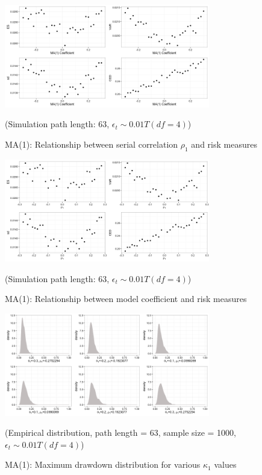\documentclass[11pt]{article}
\begin{document}
\begin{figure}[H]
\centering
\includegraphics[width = 0.8\textwidth]{../figures/simulation/T_dist_MA1_risk_measures_coefficient.png}
\caption{MA(1): Relationship between serial correlation $\rho_1$ and risk measures}
(Simulation path length: 63, $\epsilon_t \sim 0.01T(df = 4)$)
\label{fig:T_dist_MA1_risk_measures_coefficient}
\end{figure}

\begin{figure}[H]
\centering
\includegraphics[width = 0.8\textwidth]{../figures/simulation/T_dist_MA1_risk_measures_acf1.png}
\caption{MA(1): Relationship between model coefficient and risk measures}
(Simulation path length: 63, $\epsilon_t \sim 0.01T(df = 4)$)
\label{fig:T_dist_MA1_risk_measures_acf1}
\end{figure} 

\begin{figure}[H]
\centering
\includegraphics[width = 0.8\textwidth]{../figures/simulation/T_dist_MA1_maxDrawdown_dist}
\caption{MA(1): Maximum drawdown distribution for various $\kappa_1$ values }
(Empirical distribution, path length = 63, sample size = 1000, $\epsilon_t \sim 0.01T(df = 4)$)
\label{fig:T_dist_MA1_maxDrawdown_dist}
\end{figure}
\end{document}
